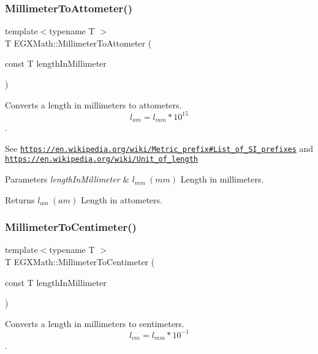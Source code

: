 \subsubsection{\texorpdfstring{Millimeter\+To\+Attometer()}{MillimeterToAttometer()}}
{\footnotesize\ttfamily template$<$typename T $>$ \\
T E\+G\+X\+Math\+::\+Millimeter\+To\+Attometer (\begin{DoxyParamCaption}\item[{const T}]{length\+In\+Millimeter }\end{DoxyParamCaption})}



Converts a length in millimeters to attometers. \[ l_{am}=l_{mm} * 10^{15} \]. 

See \href{https://en.wikipedia.org/wiki/Metric_prefix#List_of_SI_prefixes}{\tt https\+://en.\+wikipedia.\+org/wiki/\+Metric\+\_\+prefix\#\+List\+\_\+of\+\_\+\+S\+I\+\_\+prefixes} and \href{https://en.wikipedia.org/wiki/Unit_of_length}{\tt https\+://en.\+wikipedia.\+org/wiki/\+Unit\+\_\+of\+\_\+length} 
\begin{DoxyParams}{Parameters}
{\em length\+In\+Millimeter} & $ l_{mm}\ (mm)$ Length in millimeters. \\
\hline
\end{DoxyParams}
\begin{DoxyReturn}{Returns}
$ l_{am}\ (am)$ Length in attometers. 
\end{DoxyReturn}
\mbox{\label{group___e_g_x_math-_conversions-_length_conversions-_s_i-_millimeter-_s_i_gaa77c48215c6c4f46394025af4cb26ead}} 
\subsubsection{\texorpdfstring{Millimeter\+To\+Centimeter()}{MillimeterToCentimeter()}}
{\footnotesize\ttfamily template$<$typename T $>$ \\
T E\+G\+X\+Math\+::\+Millimeter\+To\+Centimeter (\begin{DoxyParamCaption}\item[{const T}]{length\+In\+Millimeter }\end{DoxyParamCaption})}



Converts a length in millimeters to centimeters. \[ l_{cm}=l_{mm} * 10^{-1} \]. 

